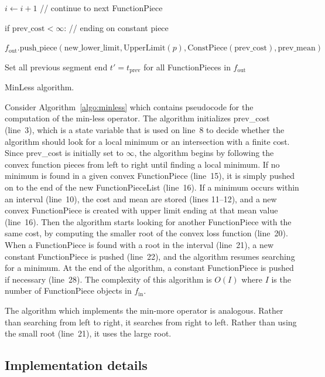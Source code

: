 \documentclass{article}
\begin{document}
\begin{algorithm}[H]
\begin{algorithmic}[1]
\begin{ALC@g}
\begin{ALC@g}
\begin{ALC@g}
      \STATE $i\gets i+1$ // continue to next FunctionPiece
    \end{ALC@g}
  \end{ALC@g}
\end{ALC@g}
  \STATE if $\text{prev\_cost} < \infty$: // ending on constant piece
  \begin{ALC@g}
    \STATE $f_{\text{out}}\text{.push\_piece}(
    \text{new\_lower\_limit}, 
    \text{UpperLimit}(p), 
    \text{ConstPiece}(\text{prev\_cost}), 
    \text{prev\_mean})$
  \end{ALC@g}
\STATE Set all previous segment end $t'=t_{\text{prev}}$  for all FunctionPieces in $f_{\text{out}}$
\caption{\label{algo:minless}MinLess algorithm.}
\end{algorithmic}
\end{algorithm}

Consider Algorithm~\ref{algo:minless} which contains pseudocode for
the computation of the min-less operator. The algorithm initializes
prev\_cost (line~3), which is a state variable that is used on line~8
to decide whether the algorithm should look for a local minimum or an
intersection with a finite cost. Since prev\_cost is initially set to
$\infty$, the algorithm begins by following the convex function pieces
from left to right until finding a local minimum. If no minimum is found in
a given convex FunctionPiece (line~15), it is simply pushed on to the
end of the new FunctionPieceList (line~16). If a minimum occurs within
an interval (line~10), the cost and mean are stored (lines 11--12),
and a new convex FunctionPiece is created with upper limit ending at
that mean value (line~16). Then the algorithm starts looking for
another FunctionPiece with the same cost, by computing the smaller
root of the convex loss function (line~20). When a FunctionPiece is
found with a root in the interval (line~21), a new constant
FunctionPiece is pushed (line~22), and the algorithm resumes searching
for a minimum. At the end of the algorithm, a constant FunctionPiece
is pushed if necessary (line~28). The complexity of this algorithm is
$O(I)$ where $I$ is the number of FunctionPiece objects in
$f_\text{in}$.

The algorithm which implements the min-more operator is
analogous. Rather than searching from left to right, it searches from
right to left. Rather than using the small root (line~21), it uses the
large root.

\subsection{Implementation details}
\end{document}
